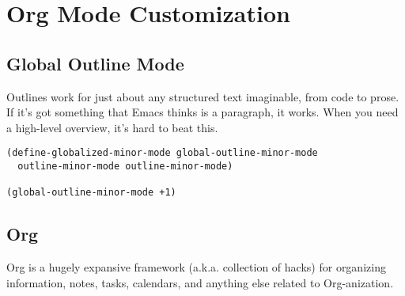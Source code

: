 \documentclass[11pt]{article}
\begin{document}
\section{Org Mode Customization}
\label{sec:orgca3d158}
\subsection{Global Outline Mode}
\label{sec:orgfcc564f}
Outlines work for just about any structured text imaginable, from code
to prose. If it's got something that Emacs thinks is a paragraph, it
works. When you need a high-level overview, it's hard to beat this.

\begin{verbatim}
(define-globalized-minor-mode global-outline-minor-mode
  outline-minor-mode outline-minor-mode)

(global-outline-minor-mode +1)
\end{verbatim}

\subsection{Org}
\label{sec:org7c598b9}
Org is a hugely expansive framework (a.k.a. collection of hacks) for
organizing information, notes, tasks, calendars, and anything else
related to Org-anization.
\end{document}
